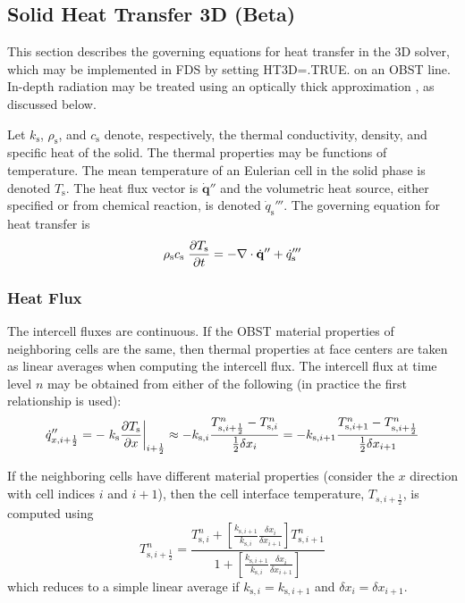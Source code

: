 \subsection{Solid Heat Transfer 3D (Beta)}
\label{sec:ht3d}

This section describes the governing equations for heat transfer in the 3D solver, which may be implemented in FDS by setting {\ct HT3D=.TRUE.} on an {\ct OBST} line.  In-depth radiation may be treated using an optically thick approximation \cite{Modest:2003}, as discussed below.

Let $k_{\mathrm{s}}$, $\rho_{\mathrm{s}}$, and $c_{\mathrm{s}}$ denote, respectively, the thermal conductivity, density, and specific heat of the solid. The thermal properties may be functions of temperature.  The mean temperature of an Eulerian cell in the solid phase is denoted $T_{\mathrm{s}}$.  The heat flux vector is $\dot{\mathbf{q}}''$ and the volumetric heat source, either specified or from chemical reaction, is denoted $\dot{q}_{\mathrm{s}}'''$.  The governing equation for heat transfer is
\begin{equation}
  \rho_{\mathrm{s}} c_{\mathrm{s}} \; \frac{\partial T_{\mathrm{s}}}{\partial t} = - \nabla\cdot\dot{\mathbf{q}}'' + \dot{q}_{\mathrm{s}}'''
  \label{eq:3dheat}
\end{equation}

\subsubsection*{Heat Flux}
\label{sec:heat_flux1}
{}
The intercell fluxes are continuous.  If the {\ct OBST} material properties of neighboring cells are the same, then thermal properties at face centers are taken as linear averages when computing the intercell flux. The intercell flux at time level $n$ may be obtained from either of the following (in practice the first relationship is used):
\begin{equation}
\label{eq:intercell_flux}
\dot{q}_{x,i+\frac{1}{2}}'' = - \left. k_{\mathrm{s}} \frac{\partial T_{\mathrm{s}}}{\partial x} \right|_{i+\frac{1}{2}} \approx - k_{{\mathrm{s}},i} \frac{T_{{\mathrm{s}},i+\frac{1}{2}}^n - T_{{\mathrm{s}},i}^n}{\frac{1}{2}\delta x_i} = - k_{{\mathrm{s}},i+1} \frac{T_{{\mathrm{s}},i+1}^n - T_{{\mathrm{s}},i+\frac{1}{2}}^n}{\frac{1}{2}\delta x_{i+1}}
\end{equation}

If the neighboring cells have different material properties (consider the $x$ direction with cell indices $i$ and $i+1$), then the cell interface temperature, $T_{s,i+\frac{1}{2}}$, is computed using
\begin{equation}
\label{eq:interface_tmp}
T_{{\mathrm{s}},i+\frac{1}{2}}^n = \frac{T_{{\mathrm{s}},i}^n + \left[\frac{k_{{\mathrm{s}},i+1}}{k_{{\mathrm{s}},i}} \frac{\delta x_i}{\delta x_{i+1}}\right] T_{{\mathrm{s}},i+1}^n}{1 + \left[\frac{k_{{\mathrm{s}},i+1}}{k_{{\mathrm{s}},i}} \frac{\delta x_i}{\delta x_{i+1}}\right]}
\end{equation}
which reduces to a simple linear average if $k_{{\mathrm{s}},i}=k_{{\mathrm{s}},i+1}$ and $\delta x_i=\delta x_{i+1}$.

